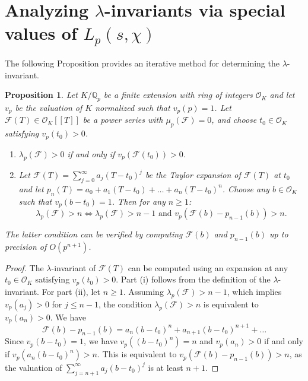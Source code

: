 \documentclass[pdflatex,sn-mathphys-num]{sn-jnl}%
\theoremstyle{plain}
\newtheorem{prop}[thm]{Proposition}
\theoremstyle{definition}
\theoremstyle{remark}
\numberwithin{equation}{section}
\newcommand{\QQ}{\mathbb{Q}}
\begin{document}
\section{Analyzing $\lambda$-invariants via special values of $L_p(s,\chi )$}
\label{Sect2}

The following Proposition provides an iterative method for determining the $\lambda$-invariant.

\begin{prop} Let $K/\QQ_p$ be a finite extension with ring of integers $\mathcal{O}_K$ and let $v_p$ be the valuation of $K$ normalized such that $v_p(p)=1$. Let
$\mathcal{F}(T)  \in \mathcal{O}_K[[T]]$ be a power series with  $\mu_p(\mathcal{F})=0$, and choose $t_0 \in \mathcal{O}_K$ satisfying $v_p(t_0) > 0$. 
\begin{enumerate}
\item[(i)] $\lambda_p (\mathcal{F}) > 0$ if and only if $v_p(\mathcal{F}(t_0))>0$. 
\item[(ii)] Let  $\mathcal{F}(T)  = \sum_{j=0}^{\infty} a_j (T-t_0)^j$ be the Taylor expansion of $\mathcal{F}(T)$ at $t_0$
and let $p_n(T) = a_0 + a_1 (T-t_0) + \dots + a_n (T-t_0)^n$. Choose any $b \in \mathcal{O}_K$ such that $v_p(b-t_0)=1$.
Then for any $n \geq 1$:
$$ \lambda_p (\mathcal{F}) > n \Longleftrightarrow \lambda_p (\mathcal{F}) > n-1 \text{ and } v_p( \mathcal{F}(b) - p_{n-1}(b) ) > n  .$$
\end{enumerate}
The latter condition can be verified by computing  $\mathcal{F}(b)$ and $p_{n-1}(b)$ up to precision of $O(p^{n+1})$.
\label{lambdacomp}
\end{prop}

\begin{proof} The $\lambda$-invariant of $\mathcal{F}(T)$ can be computed using an expansion at any $t_0 \in \mathcal{O}_K$ satisfying $v_p(t_0) > 0$. 
Part (i) follows from the definition of the $\lambda$-invariant.  For part (ii), let $n \geq 1$. Assuming $\lambda_p(\mathcal{F}) > n-1$, which implies
$v_p(a_j)>0$ for $j \leq n-1$, the condition $\lambda_p(\mathcal{F})>n$ is equivalent to $v_p(a_n)>0$. We have
$$ \mathcal{F}(b) - p_{n-1}(b) = a_n (b-t_0)^n + a_{n+1} (b-t_0)^{n+1} + \dots $$
Since $v_p(b-t_0)=1$, we have $v_p((b-t_0)^n)=n$ and $v_p(a_n)>0$ if and only if $v_p ( a_n (b-t_0)^n) > n$. This is equivalent to $v_p( \mathcal{F}(b) - p_{n-1}(b) ) > n$, as the valuation of $\sum_{j=n+1}^{\infty} a_j (b-t_0)^j$ is at least $n+1$.
\end{proof}
\end{document}
